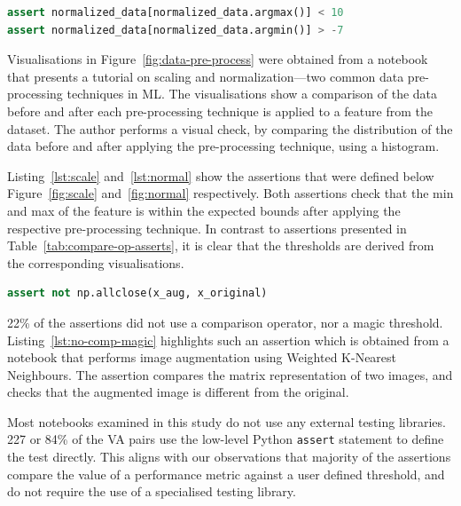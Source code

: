 \documentclass[conference]{IEEEtran}
\begin{document}
\begin{lstlisting}[language=Python, caption={Similar premise as Listing~\ref{lst:scale}, however this assertion is based on Figure~\ref{fig:normal}.}, label={lst:normal}]
assert normalized_data[normalized_data.argmax()] < 10
assert normalized_data[normalized_data.argmin()] > -7
\end{lstlisting}

Visualisations in Figure~\ref{fig:data-pre-process} were obtained from a notebook that presents a tutorial on scaling and normalization---two common data pre-processing techniques in ML. The visualisations show a comparison of the data before and after each pre-processing technique is applied to a feature from the dataset. The author performs a visual check, by comparing the distribution of the data before and after applying the pre-processing technique, using a histogram.

Listing~\ref{lst:scale} and~\ref{lst:normal} show the assertions that were defined below Figure~\ref{fig:scale} and~\ref{fig:normal} respectively. Both assertions check that the min and max of the feature is within the expected bounds after applying the respective pre-processing technique. In contrast to assertions presented in Table~\ref{tab:compare-op-asserts}, it is clear that the thresholds are derived from the corresponding visualisations.

\begin{lstlisting}[language=Python, caption={Assertion to check that an augmented image is different from the original.}, label={lst:no-comp-magic}]
assert not np.allclose(x_aug, x_original)
\end{lstlisting}

22\% of the assertions did not use a comparison operator, nor a magic threshold. Listing~\ref{lst:no-comp-magic} highlights such an assertion which is obtained from a notebook that performs image augmentation using Weighted K-Nearest Neighbours. The assertion compares the matrix representation of two images, and checks that the augmented image is different from the original.

Most notebooks examined in this study do not use any external testing libraries. 227 or 84\% of the VA pairs use the low-level Python \texttt{assert} statement to define the test directly. This aligns with our observations that majority of the assertions compare the value of a performance metric against a user defined threshold, and do not require the use of a specialised testing library. 
\end{document}

